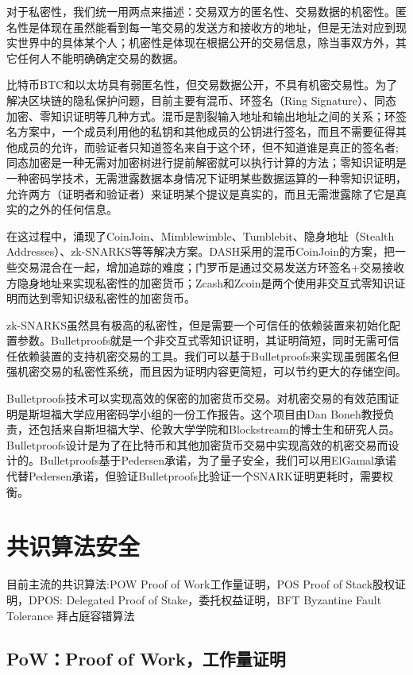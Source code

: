 \documentclass[UTF8]{ctexart}
\begin{document}
对于私密性，我们统一用两点来描述：交易双方的匿名性、交易数据的机密性。匿名性是体现在虽然能看到每一笔交易的发送方和接收方的地址，但是无法对应到现实世界中的具体某个人；机密性是体现在根据公开的交易信息，除当事双方外，其它任何人不能明确确定交易的数据。

比特币BTC和以太坊具有弱匿名性，但交易数据公开，不具有机密交易性。为了解决区块链的隐私保护问题，目前主要有混币、环签名（Ring Signature）、同态加密、零知识证明等几种方式。混币是割裂输入地址和输出地址之间的关系；环签名方案中，一个成员利用他的私钥和其他成员的公钥进行签名，而且不需要征得其他成员的允许，而验证者只知道签名来自于这个环，但不知道谁是真正的签名者;同态加密是一种无需对加密树进行提前解密就可以执行计算的方法；零知识证明是一种密码学技术，无需泄露数据本身情况下证明某些数据运算的一种零知识证明，允许两方（证明者和验证者）来证明某个提议是真实的，而且无需泄露除了它是真实的之外的任何信息。

在这过程中，涌现了CoinJoin、Mimblewimble、Tumblebit、隐身地址（Stealth Addresses）、zk-SNARKS等等解决方案。DASH采用的混币CoinJoin的方案，把一些交易混合在一起，增加追踪的难度；门罗币是通过交易发送方环签名+交易接收方隐身地址来实现私密性的加密货币；Zcash和Zcoin是两个使用非交互式零知识证明而达到零知识级私密性的加密货币。

zk-SNARKS虽然具有极高的私密性，但是需要一个可信任的依赖装置来初始化配置参数。Bulletproofs就是一个非交互式零知识证明，其证明简短，同时无需可信任依赖装置的支持机密交易的工具。我们可以基于Bulletproofs来实现虽弱匿名但强机密交易的私密性系统，而且因为证明内容更简短，可以节约更大的存储空间。

Bulletproofs技术可以实现高效的保密的加密货币交易。对机密交易的有效范围证明是斯坦福大学应用密码学小组的一份工作报告。这个项目由Dan Boneh教授负责，还包括来自斯坦福大学、伦敦大学学院和Blockstream的博士生和研究人员。Bulletproofs设计是为了在比特币和其他加密货币交易中实现高效的机密交易而设计的。Bulletproofs基于Pedersen承诺，为了量子安全，我们可以用ElGamal承诺代替Pedersen承诺，但验证Bulletproofs比验证一个SNARK证明更耗时，需要权衡。

\section{共识算法安全}

目前主流的共识算法:POW Proof of Work工作量证明，POS Proof of Stack股权证明，DPOS: Delegated Proof of Stake，委托权益证明，BFT Byzantine Fault Tolerance 拜占庭容错算法


\subsection{PoW：Proof of Work，工作量证明}
\end{document}
